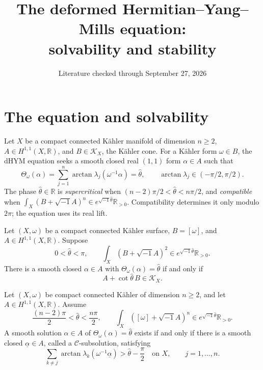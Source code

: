 \documentclass[12pt,reqno]{amsart}
\title{The deformed Hermitian--Yang--Mills equation:\\solvability and stability}
\date{Literature checked through September 27, 2026}
\newcommand{\ii}{\sqrt{-1}}
\newcommand{\R}{\mathbb R}
\begin{document}
\maketitle

\section{The equation and solvability}\label{sec:intro}
Let $X$ be a compact connected K\"ahler manifold of dimension $n\ge2$,
$A\in H^{1,1}(X,\R)$, and $B\in\mathcal K_X$, the K\"ahler cone.
For a K\"ahler form $\omega\in B$, the dHYM equation seeks a smooth closed
real $(1,1)$ form $\alpha\in A$ such that
\[
 \Theta_\omega(\alpha)
 =\sum_{j=1}^n\arctan\lambda_j(\omega^{-1}\alpha)
 =\widehat\theta,
 \qquad \arctan\lambda_j\in(-\pi/2,\pi/2).
\]
The phase $\widehat\theta\in\R$ is \emph{supercritical} when
$(n-2)\pi/2<\widehat\theta<n\pi/2$, and \emph{compatible} when
$\int_X(B+\ii A)^n\in e^{\ii\widehat\theta}\R_{>0}$.
Compatibility determines it only modulo $2\pi$; the equation uses its real lift.

\begin{theorem}\label{thm:surface}
Let $(X,\omega)$ be a compact connected K\"ahler surface, $B=[\omega]$, and $A\in H^{1,1}(X,\R)$. Suppose
\[
 0<\widehat\theta<\pi,\qquad
 \int_X(B+\ii A)^2\in e^{\ii\widehat\theta}\R_{>0}.
\]
There is a smooth closed $\alpha\in A$ with
$\Theta_\omega(\alpha)=\widehat\theta$ if and only if
\[
 A+\cot\widehat\theta\,B\in\mathcal K_X.
\]
\end{theorem}

\begin{theorem}\label{thm:subsolution}
Let $(X,\omega)$ be compact connected K\"ahler of dimension $n\ge2$, and let $A\in H^{1,1}(X,\R)$. Assume
\[
 \frac{(n-2)\pi}{2}<\widehat\theta<\frac{n\pi}{2},\qquad
 \int_X([\omega]+\ii A)^n\in e^{\ii\widehat\theta}\R_{>0}.
\]
A smooth solution $\alpha\in A$ of $\Theta_\omega(\alpha)=\widehat\theta$ exists if and only if there is a smooth closed $\underline\alpha\in A$, called a $\mathcal C$-subsolution, satisfying
\[
 \sum_{k\ne j}\arctan\lambda_k(\omega^{-1}\underline\alpha)
 >\widehat\theta-\frac\pi2
 \quad\text{on }X,\qquad j=1,\ldots,n.
\]
\end{theorem}
\end{document}
